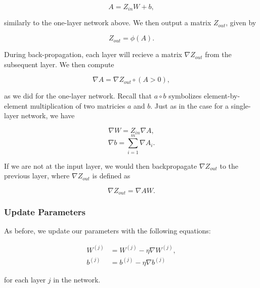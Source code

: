 $$ A = Z_{in} W + b, $$

similarly to the one-layer network above. We then output a matrix $Z_{out}$, given by

$$ Z_{out} = \phi(A).$$

During back-propagation, each layer will recieve a matrix $\nabla Z_{out}$ from
the subsequent layer. We then compute

$$ \nabla A = \nabla Z_{out} \circ (A > 0), $$

as we did for the one-layer network. Recall that $a \circ b$ symbolizes
element-by-element multiplication of two matricies $a$ and $b$.  Just as in the
case for a single-layer network, we have

$$ \nabla W = Z_{in} \nabla A, $$
$$ \nabla b = \sum_{i=1}^m \nabla A_i. $$

If we are not at the input layer, we would then backpropagate $\nabla Z_{out}$
to the previous layer, where $\nabla Z_{out}$ is defined as

$$ \nabla Z_{out} = \nabla A W. $$

\subsubsection{Update Parameters}
As before, we update our parameters with the following equations:

\begin{align*}
W^{(j)} &= W^{(j)} - \eta \nabla W^{(j)},\\
b^{(j)} &= b^{(j)} - \eta \nabla b^{(j)}
\end{align*}

for each layer $j$ in the network.
